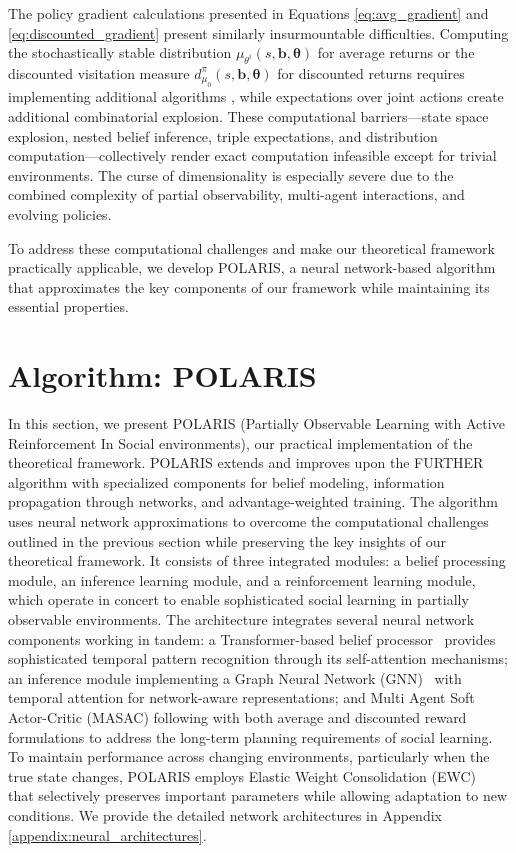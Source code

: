 \documentclass[a4paper,12pt]{report}
\begin{document}
The policy gradient calculations presented in Equations \eqref{eq:avg_gradient} and \eqref{eq:discounted_gradient} present similarly insurmountable difficulties. Computing the stochastically stable distribution $\mu_{\theta^i}(s, \boldsymbol{b}, \boldsymbol{\theta})$ for average returns or the discounted visitation measure $d^{\pi}_{\mu_0}(s, \boldsymbol{b}, \boldsymbol{\theta})$ for discounted returns requires implementing additional algorithms \citep{wicks2012algorithmcomputingstochasticallystable}, while expectations over joint actions create additional combinatorial explosion. These computational barriers—state space explosion, nested belief inference, triple expectations, and distribution computation—collectively render exact computation infeasible except for trivial environments. The curse of dimensionality is especially severe due to the combined complexity of partial observability, multi-agent interactions, and evolving policies.

To address these computational challenges and make our theoretical framework practically applicable, we develop POLARIS, a neural network-based algorithm that approximates the key components of our framework while maintaining its essential properties.

\section{Algorithm: POLARIS}

In this section, we present POLARIS (Partially Observable Learning with Active Reinforcement In Social environments), our practical implementation of the theoretical framework. POLARIS extends and improves upon the FURTHER algorithm \cite{kim2022influencing} with specialized components for belief modeling, information propagation through networks, and advantage-weighted training. The algorithm uses neural network approximations to overcome the computational challenges outlined in the previous section while preserving the key insights of our theoretical framework. It consists of three integrated modules: a belief processing module, an inference learning module, and a reinforcement learning module, which operate in concert to enable sophisticated social learning in partially observable environments. The architecture integrates several neural network components working in tandem: a Transformer-based belief processor~\cite{vaswani2017attention} provides sophisticated temporal pattern recognition through its self-attention mechanisms; an inference module implementing a Graph Neural Network (GNN)~\cite{scarselli2009graph} with temporal attention for network-aware representations; and Multi Agent Soft Actor-Critic (MASAC) following \citet{kim2022influencing} with both average and discounted reward formulations to address the long-term planning requirements of social learning. To maintain performance across changing environments, particularly when the true state changes, POLARIS employs Elastic Weight Consolidation (EWC)~\cite{kirkpatrick2017overcoming} that selectively preserves important parameters while allowing adaptation to new conditions. We provide the detailed network architectures in Appendix \ref{appendix:neural_architectures}.
\end{document}
